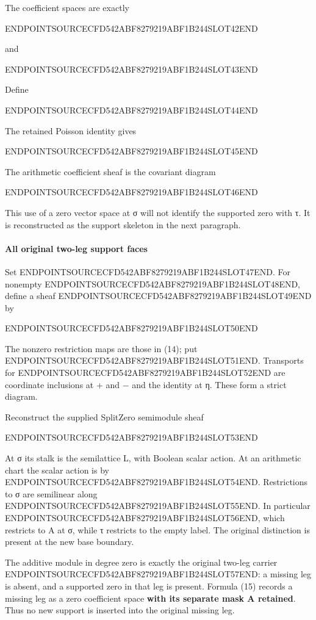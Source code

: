 The coefficient spaces are exactly

ENDPOINTSOURCECFD542ABF8279219ABF1B244SLOT42END

and

ENDPOINTSOURCECFD542ABF8279219ABF1B244SLOT43END

Define

ENDPOINTSOURCECFD542ABF8279219ABF1B244SLOT44END

The retained Poisson identity gives

ENDPOINTSOURCECFD542ABF8279219ABF1B244SLOT45END

The arithmetic coefficient sheaf is the covariant diagram

ENDPOINTSOURCECFD542ABF8279219ABF1B244SLOT46END

This use of a zero vector space at σ will not identify the supported zero with τ. It is reconstructed as the support skeleton in the next paragraph.

\paragraph{All original two-leg support faces}\label{endpoint-tau_base--all-original-two-leg-support-faces}

Set ENDPOINTSOURCECFD542ABF8279219ABF1B244SLOT47END. For nonempty ENDPOINTSOURCECFD542ABF8279219ABF1B244SLOT48END, define a sheaf ENDPOINTSOURCECFD542ABF8279219ABF1B244SLOT49END by

ENDPOINTSOURCECFD542ABF8279219ABF1B244SLOT50END

The nonzero restriction maps are those in (14); put ENDPOINTSOURCECFD542ABF8279219ABF1B244SLOT51END. Transports for ENDPOINTSOURCECFD542ABF8279219ABF1B244SLOT52END are coordinate inclusions at + and − and the identity at η. These form a strict diagram.

Reconstruct the supplied SplitZero semimodule sheaf

ENDPOINTSOURCECFD542ABF8279219ABF1B244SLOT53END

At σ its stalk is the semilattice L, with Boolean scalar action. At an arithmetic chart the scalar action is by ENDPOINTSOURCECFD542ABF8279219ABF1B244SLOT54END. Restrictions to σ are semilinear along ENDPOINTSOURCECFD542ABF8279219ABF1B244SLOT55END. In particular ENDPOINTSOURCECFD542ABF8279219ABF1B244SLOT56END, which restricts to A at σ, while τ restricts to the empty label. The original distinction is present at the new base boundary.

The additive module in degree zero is exactly the original two-leg carrier ENDPOINTSOURCECFD542ABF8279219ABF1B244SLOT57END: a missing leg is absent, and a supported zero in that leg is present. Formula (15) records a missing leg as a zero coefficient space \textbf{with its separate mask A retained}. Thus no new support is inserted into the original missing leg.


